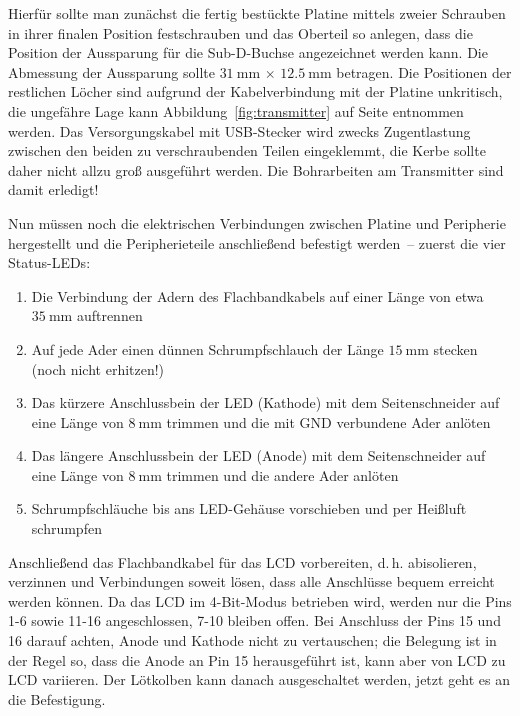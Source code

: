 \documentclass[paper=a4, parskip, numbers=noenddot, toc=listof, headsepline]{scrbook}
\begin{document}
					Hierfür sollte man zunächst die fertig bestückte Platine mittels zweier Schrauben in ihrer finalen Position festschrauben und das Oberteil so anlegen, dass die Position der Aussparung für die Sub-D-Buchse angezeichnet werden kann. Die Abmessung der Aussparung sollte $\SI{31}{\milli\metre}\,\times\,\SI{12,5}{\milli\metre}$ betragen. Die Positionen der restlichen Löcher sind aufgrund der Kabelverbindung mit der Platine unkritisch, die ungefähre Lage kann Abbildung~\ref{fig:transmitter} auf Seite \pageref{fig:transmitter} entnommen werden. Das Versorgungskabel mit USB-Stecker wird zwecks Zugentlastung zwischen den beiden zu verschraubenden Teilen eingeklemmt, die Kerbe sollte daher nicht allzu groß ausgeführt werden. Die Bohrarbeiten am Transmitter sind damit erledigt!

					Nun müssen noch die elektrischen Verbindungen zwischen Platine und Peripherie hergestellt und die Peripherieteile anschließend befestigt werden~-- zuerst die vier Status-LEDs:

					\begin{enumerate}
						\label{enum:leds}
						\item Die Verbindung der Adern des Flachbandkabels auf einer Länge von etwa $\SI{35}{\milli\metre}$ auftrennen
						\item Auf jede Ader einen dünnen Schrumpfschlauch der Länge $\SI{15}{\milli\metre}$ stecken (noch nicht erhitzen!)
						\item Das kürzere Anschlussbein der LED (Kathode) mit dem Seitenschneider auf eine Länge von $\SI{8}{\milli\metre}$ trimmen und die mit GND verbundene Ader anlöten
						\item Das längere Anschlussbein der LED (Anode) mit dem Seitenschneider auf eine Länge von $\SI{8}{\milli\metre}$ trimmen und die andere Ader anlöten
						\item Schrumpfschläuche bis ans LED-Gehäuse vorschieben und per Heißluft schrumpfen
					\end{enumerate}

					Anschließend das Flachbandkabel für das LCD vorbereiten, d.\,h. abisolieren, verzinnen und Verbindungen soweit lösen, dass alle Anschlüsse bequem erreicht werden können. Da das LCD im 4-Bit-Modus betrieben wird, werden nur die Pins 1-6 sowie 11-16 angeschlossen, 7-10 bleiben offen. Bei Anschluss der Pins 15 und 16 darauf achten, Anode und Kathode nicht zu vertauschen; die Belegung ist in der Regel so, dass die Anode an Pin 15 herausgeführt ist, kann aber von LCD zu LCD variieren. Der Lötkolben kann danach ausgeschaltet werden, jetzt geht es an die Befestigung.
\end{document}
